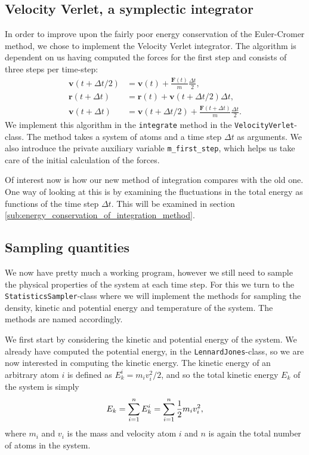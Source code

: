 \documentclass[a4paper]{article}
\renewcommand{\vec}[1]{\mathbf{#1}}
\begin{document}
\subsection{Velocity Verlet, a symplectic integrator}
\label{sub:velocity_verlet_a_symplectic_integrator}
    
    In order to improve upon the fairly poor energy conservation of the
    Euler-Cromer method, we chose to implement the Velocity Verlet integrator.
    The algorithm is dependent on us having computed the forces for the first
    step and consists of three steps per time-step:
    \begin{align*}
        \vec{v}(t + \Delta t/2) &= \vec{v}(t) + \frac{\vec{F}(t)}{m}\frac{\Delta t}{2},\\
        \vec{r}(t + \Delta t) &= \vec{r}(t) + \vec{v}(t + \Delta t/2)\Delta t, \\
        \vec{v}(t + \Delta t) &= \vec{v}(t + \Delta t/2) + \frac{\vec{F}(t+\Delta t)}{m} \frac{\Delta t}{2}.
    \end{align*}
    We implement this algorithm in the \texttt{integrate} method in the
    \texttt{VelocityVerlet}-class. The method takes a system of atoms and a
    time step $\Delta t$ as arguments. We also introduce the private auxiliary
    variable \texttt{m\_first\_step}, which helps us take care of the initial
    calculation of the forces.
    
    Of interest now is how our new method of integration compares with the old
    one. One way of looking at this is by examining the fluctuations in the
    total energy as functions of the time step $\Delta t$. This will be
    examined in section \ref{sub:energy_conservation_of_integration_method}.
    
    \subsection{Sampling quantities}
    \label{sub:sampling_quantities}
   
    We now have pretty much a working program, however we still need to sample
    the physical properties of the system at each time step. For this we turn
    to the \texttt{StatisticsSampler}-class where we will implement the methods
    for sampling the density, kinetic and potential energy and temperature of
    the system. The methods are named accordingly.
    
    We first start by considering the kinetic and potential energy of the
    system. We already have computed the potential energy, in the
    \texttt{LennardJones}-class, so we are now interested in computing the
    kinetic energy. The kinetic energy of an arbitrary atom $i$ is defined as
    $E_{k}^i = m_iv_i^2/2$, and so the total kinetic energy $E_k$ of the system
    is simply
    \begin{equation}
        \notag
        E_k = \sum^{n}_{i=1} E_k^i = \sum^{n}_{i=1} \frac{1}{2}m_iv_i^2,
    \end{equation}
    where $m_i$ and $v_i$ is the mass and velocity atom $i$ and $n$ is again
    the total number of atoms in the system.
    
\end{document}
